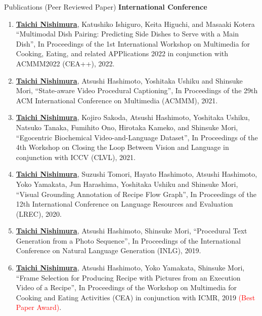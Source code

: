\begin{rSection}{Publications (Peer Reviewed Paper)}
{\bf International Conference}
\vspace{-0.15cm}
\begin{enumerate}
    \item \underline{{\bf Taichi Nishimura}}, Katushiko Ishiguro, Keita Higuchi, and Masaaki Kotera ``Multimodal Dish Pairing: Predicting Side Dishes to Serve with a Main Dish'', In Proceedings of the 1st International Workshop on Multimedia for Cooking, Eating, and related APPlications 2022 in conjunction with ACMMM2022 (CEA++), 2022.
    \item \underline{{\bf Taichi Nishimura}}, Atsushi Hashimoto, Yoshitaka Ushiku and Shinsuke Mori, ``State-aware Video Procedural Captioning'', In Proceedings of the 29th ACM International Conference on Multimedia (ACMMM), 2021.
    \item \underline{{\bf Taichi Nishimura}}, Kojiro Sakoda, Atsushi Hashimoto, Yoshitaka Ushiku, Natsuko Tanaka, Fumihito Ono, Hirotaka Kameko, and Shinsuke Mori, ``Egocentric Biochemical Video-and-Language Dataset'', In Proceedings of the 4th Workshop on Closing the Loop Between Vision and Language in conjunction with ICCV (CLVL), 2021.
    \item \underline{{\bf Taichi Nishimura}}, Suzushi Tomori, Hayato Hashimoto, Atsushi Hashimoto, Yoko Yamakata, Jun Harashima, Yoshitaka Ushiku and Shinsuke Mori, ``Visual Grounding Annotation of Recipe Flow Graph'', In Proceedings of the 12th International Conference on Language Resources and Evaluation (LREC), 2020.
    \item \underline{{\bf Taichi Nishimura}}, Atsushi Hashimoto, Shinsuke Mori, ``Procedural Text Generation from a Photo Sequence'', In Proceedings of 
the International Conference on Natural Language Generation (INLG), 2019.
    \item \underline{{\bf Taichi Nishimura}}, Atsushi Hashimoto, Yoko Yamakata, Shinsuke Mori, ``Frame Selection for Producing Recipe with Pictures from an Execution Video of a Recipe'', In Proceedings of the Workshop on Multimedia for Cooking and Eating Activities (CEA) in conjunction with ICMR, 2019 \textcolor{red}{(Best Paper Award)}.
\end{enumerate}


\end{rSection}
